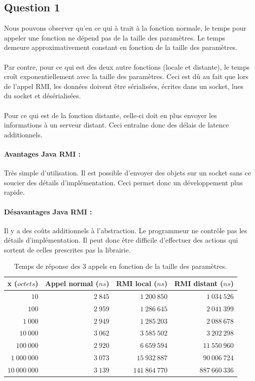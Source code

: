\documentclass[12pt,letterpaper]{article}
\begin{document}
\subsection*{Question 1}
Nous pouvons observer qu'en ce qui à trait à la fonction normale, le temps pour appeler une fonction ne dépend pas de la taille des paramètres.
Le temps demeure approximativement constant en fonction de la taille des paramètres.\\
\\
Par contre, pour ce qui est des deux autre fonctions (locale et distante), le temps croît exponentiellement avec la taille des paramètres.
Ceci est dû au fait que lors de l'appel RMI, les données doivent être sérialisées, écrites dans un socket, lues du socket et désérialisées.\\
\\
Pour ce qui est de la fonction distante, celle-ci doit en plus envoyer les informations à un serveur distant.
Ceci entraîne donc des délais de latence additionnels.

\paragraph{Avantages Java RMI :}
Très simple d'utilisation.
Il est possible d'envoyer des objets sur un socket sans ce soucier des détails d'implémentation.
Ceci permet donc un développement plus rapide.

\paragraph{Désavantages Java RMI :}
Il y a des coûts additionnels à l'abstraction.
Le programmeur ne contrôle pas les détails d'implémentation.
Il peut donc être difficile d'effectuer des actions qui sortent de celles prescrites pas la librairie.

\begin{table}[h]
  \centering
  \begin{tabular}{rrrr}
    \toprule
    \textbf{x ($octets$)} & \textbf{Appel normal ($ns$)} & \textbf{RMI local ($ns$)} & \textbf{RMI distant ($ns$)} \\ \hline
            $10$ & $2~845$ &   $1~200~850$ &   $1~034~526$ \\
           $100$ & $2~959$ &   $1~286~645$ &   $2~041~399$ \\
         $1~000$ & $2~949$ &   $1~285~203$ &   $2~088~678$ \\
        $10~000$ & $3~062$ &   $3~585~502$ &   $3~202~298$ \\
       $100~000$ & $2~920$ &   $6~659~594$ &  $11~550~960$ \\
     $1~000~000$ & $3~073$ &  $15~932~887$ &  $90~006~724$ \\
    $10~000~000$ & $3~139$ & $141~864~770$ & $887~660~336$ \\
    \bottomrule
  \end{tabular}
  \caption{Temps de réponse des 3 appels en fonction de la taille des paramètres.}
  \label{tab:temps}
\end{table}
\end{document}
